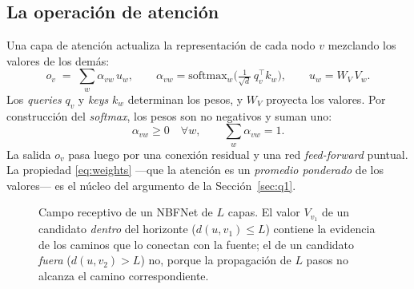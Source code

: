 \documentclass[11pt]{article}
\theoremstyle{plain}
\theoremstyle{definition}
\newcommand{\softmax}{\mathrm{softmax}}
\begin{document}
\subsection{La operación de atención}
\label{sec:attn}

Una capa de atención actualiza la representación de cada nodo $v$ mezclando los valores de los demás:
\begin{equation}
\label{eq:attn}
o_v \;=\; \sum_{w} \alpha_{vw}\, u_w,
\qquad
\alpha_{vw} = \softmax_w\!\Big(\tfrac{1}{\sqrt{d}}\, q_v^{\!\top} k_w\Big),
\qquad
u_w = W_V\, V_w .
\end{equation}
Los \emph{queries} $q_v$ y \emph{keys} $k_w$ determinan los pesos, y $W_V$ proyecta los valores. Por
construcción del \emph{softmax}, los pesos son no negativos y suman uno:
\begin{equation}
\label{eq:weights}
\alpha_{vw}\ge 0 \quad\forall w,
\qquad
\sum_w \alpha_{vw} = 1 .
\end{equation}
La salida $o_v$ pasa luego por una conexión residual y una red \emph{feed-forward} puntual. La
propiedad \eqref{eq:weights} ---que la atención es un \emph{promedio ponderado} de los valores--- es
el núcleo del argumento de la Sección~\ref{sec:q1}.

\begin{figure}[t]
\centering
{}
\caption{Campo receptivo de un NBFNet de $L$ capas. El valor $V_{v_1}$ de un candidato \emph{dentro}
del horizonte ($d(u,v_1)\le L$) contiene la evidencia de los caminos que lo conectan con la fuente; el
de un candidato \emph{fuera} ($d(u,v_2)>L$) no, porque la propagación de $L$ pasos no alcanza el camino
correspondiente.}
\label{fig:horizon}
\end{figure}
\end{document}
